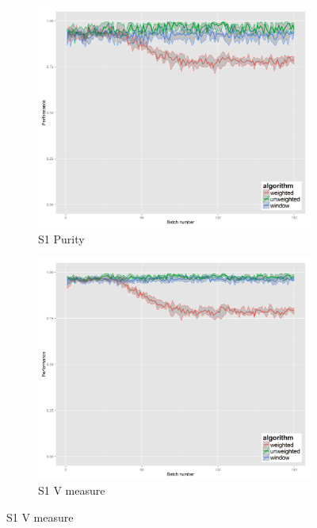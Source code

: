 \begin{figure}[H]
\begin{subfigure}{.45\textwidth}
  \centering
  \includegraphics[width=.7\linewidth]{s_set/s_set_1_ci_one_size_purity.png}
  \caption{S1 Purity}
\end{subfigure}%
\begin{subfigure}{.45\textwidth}
  \centering
  \includegraphics[width=.7\linewidth]{s_set/s_set_1_ci_one_size_vmeasure.png}
  \caption{S1 V measure}
\end{subfigure}


\end{figure}
